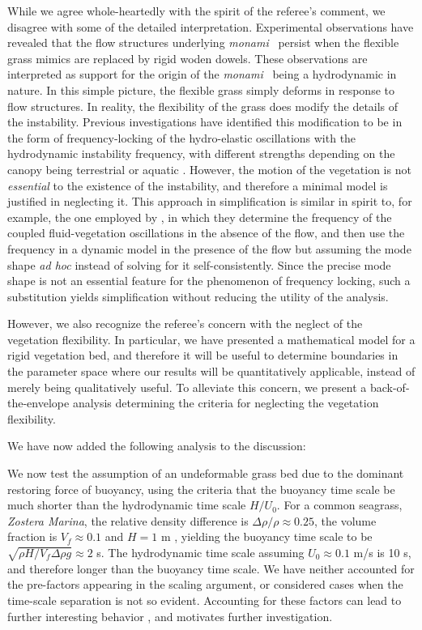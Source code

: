 \documentclass[letterpaper,10pt]{article}
\newcommand{\monami}{\textit{monami}}
\newcommand{\revise}[1]{{\color{blue} {#1}}}
\begin{document}
\begin{enumerate}
While we agree whole-heartedly with the spirit of the referee's comment, we disagree with some of the detailed interpretation. 
Experimental observations have revealed that the flow structures underlying \monami~ persist when the flexible grass mimics are replaced by rigid woden dowels.
These observations are interpreted as support for the origin of the \monami~ being a hydrodynamic in nature.
In this simple picture, the flexible grass simply deforms in response to flow structures.
In reality, the flexibility of the grass does modify the details of the instability.
Previous investigations have identified this modification to be in the form of frequency-locking of the hydro-elastic oscillations with the hydrodynamic instability frequency, with different strengths depending on the canopy being terrestrial \citep{Delangre04,Delangre06} or aquatic \cite{Gosselin2009}.
However, the motion of the vegetation is not \textit{essential} to the existence of the instability, and therefore a minimal model is justified in neglecting it.
This approach in simplification is similar in spirit to, for example, the one employed by \cite{Gosselin2009}, in which they determine the frequency of the coupled fluid-vegetation oscillations in the absence of the flow, and then use the frequency in a dynamic model in the presence of the flow but assuming the mode shape \textit{ad hoc} instead of solving for it self-consistently. 
Since the precise mode shape is not an essential feature for the phenomenon of frequency locking, such a substitution yields simplification without reducing the utility of the analysis.

However, we also recognize the referee's concern with the neglect of the vegetation flexibility.
In particular, we have presented a mathematical model for a rigid vegetation bed, and therefore it will be useful to determine boundaries in the parameter space where our results will be quantitatively applicable, instead of merely being qualitatively useful.
To alleviate this concern, we present a back-of-the-envelope analysis determining the criteria for neglecting the vegetation flexibility.

We have now added the following analysis to the discussion:

\revise{
We now test the assumption of an undeformable grass bed due to the dominant restoring force of buoyancy, using the criteria that the buoyancy time scale be much shorter than the hydrodynamic time scale $H/U_0$.
For a common seagrass, \textit{Zostera Marina}, the relative density difference is $\Delta \rho /\rho \approx 0.25$, the volume fraction is $V_f \approx 0.1$ and $H=1$ m \citep{Fonseca98}, yielding the buoyancy time scale to be $\sqrt{\rho H/V_f \Delta \rho g} \approx 2$ s.
The hydrodynamic time scale assuming $U_0 \approx 0.1$ m/s is 10 s, and therefore longer than the buoyancy time scale.
We have neither accounted for the pre-factors appearing in the scaling argument, or considered cases when the time-scale separation is not so evident. 
Accounting for these factors can lead to further interesting behavior \citep{Delangre06,Gosselin2009}, and motivates further investigation. 
}


\end{enumerate}
\end{document}
